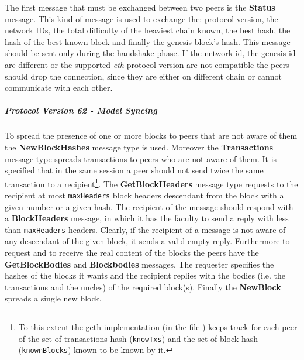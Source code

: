 The first message that must be exchanged between two peers
is the \textbf{Status} message. This kind of message is used to exchange
the: protocol version, the network IDs, the total difficulty of the
heaviest chain known, the best hash, the hash of the best known block and
finally the genesis block's hash. This message should be sent only during
the handshake phase.
If the network id, the genesis id are different or the supported
\textit{eth} protocol version are not compatible the peers should
drop the connection, since they are either on different chain or cannot
communicate with each other.

\subparagraph{Protocol Version 62 - Model Syncing}
To spread the presence of one or more blocks to peers that are not aware
of them the \textbf{NewBlockHashes} message type is used.
Moreover the \textbf{Transactions} message type spreads transactions to
peers who are not aware of them. It is specified that
in the same session a peer should not send twice the same
transaction to a
recipient\footnote{To this extent the
geth implementation (in the file ) keeps track for each
peer of the set of transactions hash (\texttt{knowTxs}) and the set of
block hash (\texttt{knownBlocks}) known to be known by it.}.
The \textbf{GetBlockHeaders} message type requests to the recipient at most
\texttt{maxHeaders} block headers descendant from the block with a given
number or a given hash.
The recipient of the message should respond with a \textbf{BlockHeaders}
message, in which it has the faculty to send a reply with less than
\texttt{maxHeaders} headers. Clearly, if the recipient of a message
is not aware of any descendant of the given block, it sends a valid empty
reply. Furthermore to request and to receive the real content of the blocks the
peers have the \textbf{GetBlockBodies} and \textbf{Blockbodies} messages.
The requester specifies the hashes of the blocks it wants and the recipient
replies with the bodies (i.e. the transactions and the uncles) of
the required block(s).
Finally the \textbf{NewBlock} spreads a single new block.

